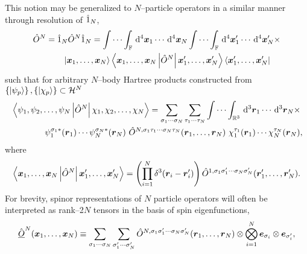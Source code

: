 %
This notion may be generalized to $N$--particle operators in a similar manner through resolution of $\hat{1}_N$,
\begin{align}
  \hat{O}^N &= \hat{1}_N \hat{O}^N \hat{1}_N 
  = \idotsint_{\mathbb F}
    \,\mathrm{d}^4\boldsymbol{x}_1 \cdots   \,\mathrm{d}^4\boldsymbol{x}_N
    \idotsint_{\mathbb F}
    \,\mathrm{d}^4\boldsymbol{x}'_1 \cdots  \,\mathrm{d}^4\boldsymbol{x}'_N \times \nonumber\\
    &\qquad\left\vert \boldsymbol{x}_1,\ldots,\boldsymbol{x}_N \right\rangle \left\langle \boldsymbol{x}_1,\ldots,\boldsymbol{x}_N \left\vert \hat{O}^{N} \right\vert \boldsymbol{x}'_1,\ldots,\boldsymbol{x}'_N \right\rangle\left\langle \boldsymbol{x}'_1,\ldots,\boldsymbol{x}'_N \right\vert 
\end{align}
such that for arbitrary $N$--body Hartree products constructed from $\left \lbrace \left\vert \psi_p \right\rangle \right\rbrace,\left \lbrace \left\vert \chi_p \right\rangle \right\rbrace \subset \mathcal{H}^N$
\begin{align}
  \label{eq:SpinorOpInnerN}
  &\left\langle \psi_1,\psi_2,\ldots,\psi_N \left\vert \hat{O}^N \right\vert \chi_1,\chi_2,\ldots,\chi_N \right\rangle =  
  \sum_{\sigma_1\cdots\sigma_N}\sum_{\tau_1\cdots\tau_N} \idotsint_{\mathbb R^3} 
    \,\mathrm{d}^3\boldsymbol{r}_1\cdots\,\mathrm{d}^3\boldsymbol{r}_N  \nonumber \times \\ &\qquad \qquad
    \psi_1^{\sigma_1*}(\boldsymbol{r}_1) \cdots \psi_N^{\sigma_N*}(\boldsymbol{r}_N) ~ \hat{O}^{N,\sigma_1\tau_1\cdots\sigma_N\tau_N}(\boldsymbol{r}_1,\ldots,\boldsymbol{r}_N) ~ 
    \chi_1^{\tau_1}(\boldsymbol{r}_1) \cdots \chi_N^{\tau_N}(\boldsymbol{r}_N),
\end{align}
where
\begin{equation}
  \label{eq:LocalSpinorOpN}
  \left\langle \boldsymbol{x}_1,\ldots,\boldsymbol{x}_N \left\vert \hat{O}^{N} \right\vert \boldsymbol{x}'_1,\ldots,\boldsymbol{x}'_N \right\rangle = 
    \left(\prod_{i=1}^N\delta^3(\boldsymbol{r}_i - \boldsymbol{r}'_i)\right) 
    \hat{O}^{1,\sigma_1\sigma_1'\cdots\sigma_N\sigma_N'}(\boldsymbol{r}_1',\ldots,\boldsymbol{r}_N').
\end{equation}
For brevity, spinor representations of $N$ particle operators will 
often be interpreted as rank--2$N$ tensors in the basis of spin eigenfunctions, 
\begin{equation}
\label{eq:SpinorOpN}
\hat{\underline{O}}^N (\boldsymbol{x}_1,\ldots,\boldsymbol{x}_N) \equiv \sum_{\sigma_1\cdots\sigma_N}\sum_{\sigma'_1\cdots\sigma'_N}  \hat{O}^{N,\sigma_1\sigma_1'\cdots\sigma_N\sigma_N'}(\boldsymbol{r}_1,\ldots,\boldsymbol{r}_N) 
  \otimes \bigotimes_{i=1}^N \boldsymbol{e}_{\sigma_i} \otimes \boldsymbol{e}_{\sigma_i'}, 
\end{equation}
